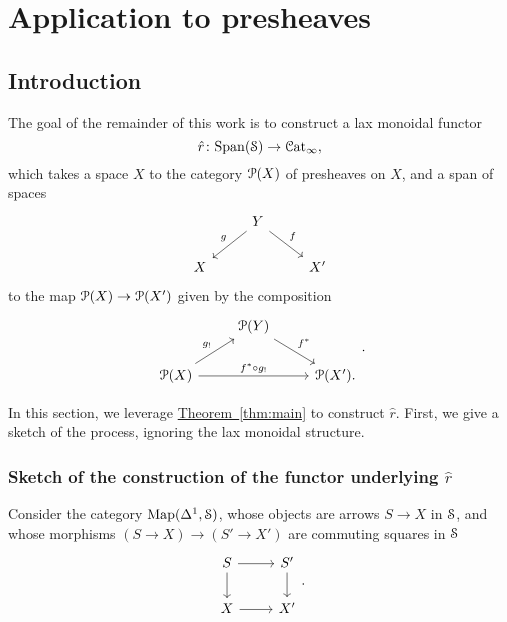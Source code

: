 \documentclass[main.tex]{subfiles}
\begin{document}
\section{Application to presheaves}
\label{sec:application_to_presheaves}

\subsection{Introduction}
\label{ssc:introduction}

The goal of the remainder of this work is to construct a lax monoidal functor
\begin{equation}
  \label{eq:rhat}
  \hat{r}\colon \Span(\S) \to \ICat,
\end{equation}
which takes a space $X$ to the category $\P(X)$ of presheaves on $X$, and a span of spaces
\begin{equation*}
  \begin{tikzcd}
    & Y
    \arrow[dl, swap, "g"]
    \arrow[dr, "f"]
    \\
    X
    && X'
  \end{tikzcd}
\end{equation*}
to the map $\P(X) \to \P(X')$ given by the composition
\begin{equation*}
  \begin{tikzcd}
    & \P(Y)
    \arrow[dr, "f^{*}"]
    \\
    \P(X)
    \arrow[ur, "g_{!}"]
    \arrow[rr, "f^{*} \circ g_{!}"]
    && \P(X').
  \end{tikzcd}.
\end{equation*}

In this section, we leverage \hyperref[thm:main]{Theorem~\ref*{thm:main}} to construct $\hat{r}$. First, we give a sketch of the process, ignoring the lax monoidal structure.

\subsubsection{Sketch of the construction of the functor underlying \texorpdfstring{$\hat{r}$}{r}}
\label{sss:sketch_of_underlying_functor}

Consider the category $\Map(\Delta^{1}, \S)$, whose objects are arrows $S \to X$ in $\S$, and whose morphisms $(S \to X) \to (S' \to X')$ are commuting squares in $\S$
\begin{equation*}
  \begin{tikzcd}
    S
    \arrow[r]
    \arrow[d]
    & S'
    \arrow[d]
    \\
    X
    \arrow[r]
    & X'
  \end{tikzcd}.
\end{equation*}
\end{document}
